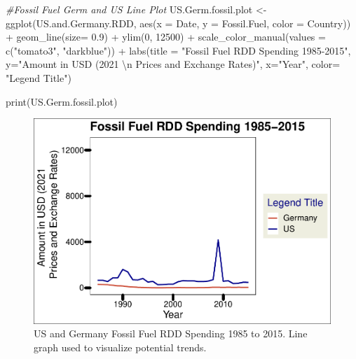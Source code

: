 \documentclass[
  12pt,
]{article}
\newenvironment{Shaded}{\begin{snugshade}}{\end{snugshade}}
\newcommand{\AttributeTok}[1]{\textcolor[rgb]{0.77,0.63,0.00}{#1}}
\newcommand{\CommentTok}[1]{\textcolor[rgb]{0.56,0.35,0.01}{\textit{#1}}}
\newcommand{\DecValTok}[1]{\textcolor[rgb]{0.00,0.00,0.81}{#1}}
\newcommand{\FloatTok}[1]{\textcolor[rgb]{0.00,0.00,0.81}{#1}}
\newcommand{\FunctionTok}[1]{\textcolor[rgb]{0.00,0.00,0.00}{#1}}
\newcommand{\NormalTok}[1]{#1}
\newcommand{\OtherTok}[1]{\textcolor[rgb]{0.56,0.35,0.01}{#1}}
\newcommand{\SpecialCharTok}[1]{\textcolor[rgb]{0.00,0.00,0.00}{#1}}
\newcommand{\StringTok}[1]{\textcolor[rgb]{0.31,0.60,0.02}{#1}}
\begin{document}
\begin{Shaded}
\begin{Highlighting}[]
\CommentTok{\#Fossil Fuel Germ and US Line Plot}
\NormalTok{US.Germ.fossil.plot }\OtherTok{\textless{}{-}} \FunctionTok{ggplot}\NormalTok{(US.and.Germany.RDD,}
                              \FunctionTok{aes}\NormalTok{(}\AttributeTok{x =}\NormalTok{ Date,}
                                  \AttributeTok{y =}\NormalTok{ Fossil.Fuel, }
                                  \AttributeTok{color =}\NormalTok{ Country)) }\SpecialCharTok{+} 
  \FunctionTok{geom\_line}\NormalTok{(}\AttributeTok{size=} \FloatTok{0.9}\NormalTok{) }\SpecialCharTok{+}
  \FunctionTok{ylim}\NormalTok{(}\DecValTok{0}\NormalTok{, }\DecValTok{12500}\NormalTok{) }\SpecialCharTok{+}
  \FunctionTok{scale\_color\_manual}\NormalTok{(}\AttributeTok{values =} \FunctionTok{c}\NormalTok{(}\StringTok{"tomato3"}\NormalTok{, }\StringTok{"darkblue"}\NormalTok{)) }\SpecialCharTok{+}
  \FunctionTok{labs}\NormalTok{(}\AttributeTok{title =} \StringTok{"Fossil Fuel RDD Spending 1985{-}2015"}\NormalTok{,}
       \AttributeTok{y=}\StringTok{"Amount in USD (2021 }\SpecialCharTok{\textbackslash{}n}\StringTok{ Prices and Exchange Rates)"}\NormalTok{,}
       \AttributeTok{x=}\StringTok{"Year"}\NormalTok{,}
       \AttributeTok{color=} \StringTok{"Legend Title"}\NormalTok{)}

\FunctionTok{print}\NormalTok{(US.Germ.fossil.plot)}
\end{Highlighting}
\end{Shaded}

\begin{figure}
\centering
\includegraphics{Chang_Jenkins_Mullens_ENV872_Final_files/figure-latex/Fossil Fuel Germ and US Line-1.pdf}
\caption{US and Germany Fossil Fuel RDD Spending 1985 to 2015. Line
graph used to visualize potential trends.}
\end{figure}
\end{document}
